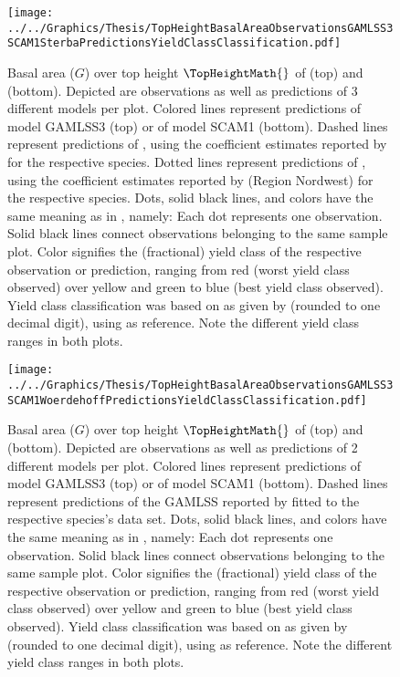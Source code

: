 \begin{figure}[h]
  \centering
  \texttt{[image: ../../Graphics/Thesis/TopHeightBasalAreaObservationsGAMLSS3SCAM1SterbaPredictionsYieldClassClassification.pdf]}
  \caption{Basal area (\(G\)) over top height \(\TopHeightMath{}\) of \Beech{} (top) and \Spruce{} (bottom). Depicted are observations as well as predictions of 3 different models per plot.  Colored lines represent predictions of model GAMLSS3 (top) or of model SCAM1 (bottom).  Dashed lines represent predictions of , using the coefficient estimates reported by \textcite{Woerdehoff2016} for the respective species.  Dotted lines represent predictions of , using the coefficient estimates reported by \textcite{Doebbeler2004} (Region Nordwest) for the respective species.  Dots, solid black lines, and colors have the same meaning as in , namely:  Each dot represents one observation.  Solid black lines connect observations belonging to the same sample plot.  Color signifies the (fractional) yield class of the respective observation or prediction, ranging from red (worst yield class observed) over yellow and green to blue (best yield class observed).  Yield class classification was based on \ProductivityIndexText{} as given by  (rounded to one decimal digit), using  as reference.  Note the different yield class ranges in both plots.}
  \label{fig:TopHeightBasalAreaObservationsGAMLSS3SCAM1SterbaPredictionsYieldClassClassification}
\end{figure}

\begin{figure}[h]
  \centering
  \texttt{[image: ../../Graphics/Thesis/TopHeightBasalAreaObservationsGAMLSS3SCAM1WoerdehoffPredictionsYieldClassClassification.pdf]}
  \caption{Basal area (\(G\)) over top height \(\TopHeightMath{}\) of \Beech{} (top) and \Spruce{} (bottom). Depicted are observations as well as predictions of 2 different models per plot.  Colored lines represent predictions of model GAMLSS3 (top) or of model SCAM1 (bottom).  Dashed lines represent predictions of the GAMLSS reported by \textcite{Woerdehoff2016} fitted to the respective species’s data set.  Dots, solid black lines, and colors have the same meaning as in , namely:  Each dot represents one observation.  Solid black lines connect observations belonging to the same sample plot.  Color signifies the (fractional) yield class of the respective observation or prediction, ranging from red (worst yield class observed) over yellow and green to blue (best yield class observed).  Yield class classification was based on \ProductivityIndexText{} as given by  (rounded to one decimal digit), using  as reference.  Note the different yield class ranges in both plots.}
  \label{fig:TopHeightBasalAreaObservationsGAMLSS3SCAM1WoerdehoffPredictionsYieldClassClassification}
\end{figure}


\clearpage{}

